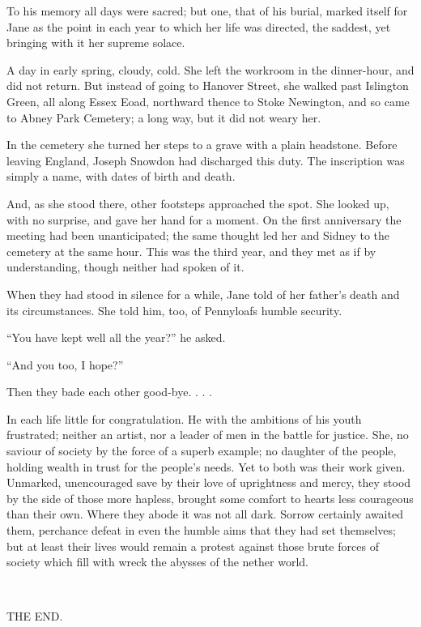 To his memory all days were sacred; but one, that of his burial, marked
itself for Jane as the point in each year to which her life was
directed, the saddest, yet bringing with it her supreme solace.

A day in early spring, cloudy, cold. She left the workroom in the
dinner-hour, and did not return. But instead of going to Hanover Street,
she walked past Islington Green, all {\protect\hypertarget{309}{}{}}
along Essex Eoad, northward thence to Stoke Newington, and so came to
Abney Park Cemetery; a long way, but it did not weary her.

In the cemetery she turned her steps to a grave with a plain headstone.
Before leaving England, Joseph Snowdon had discharged this duty. The
inscription was simply a name, with dates of birth and death.

And, as she stood there, other footsteps approached the spot. She looked
up, with no surprise, and gave her hand for a moment. On the first
anniversary the meeting had been unanticipated; the same thought led her
and Sidney to the cemetery at the same hour. This was the third year,
and they met as if by understanding, though neither had spoken of it.

When they had stood in silence for a while, Jane told of her father's
death and its circumstances. She told him, too, of Pennyloafs humble
security.

``You have kept well all the year?'' he asked.

``And you too, I hope?''

Then they bade each other good-bye. . . .

In each life little for congratulation. He
{\protect\hypertarget{310}{}{}}with the ambitions of his youth
frustrated; neither an artist, nor a leader of men in the battle for
justice. She, no saviour of society by the force of a superb example; no
daughter of the people, holding wealth in trust for the people's needs.
Yet to both was their work given. Unmarked, unencouraged save by their
love of uprightness and mercy, they stood by the side of those more
hapless, brought some comfort to hearts less courageous than their own.
Where they abode it was not all dark. Sorrow certainly awaited them,
perchance defeat in even the humble aims that they had set themselves;
but at least their lives would remain a protest against those brute
forces of society which fill with wreck the abysses of the nether world.

~

THE END.
